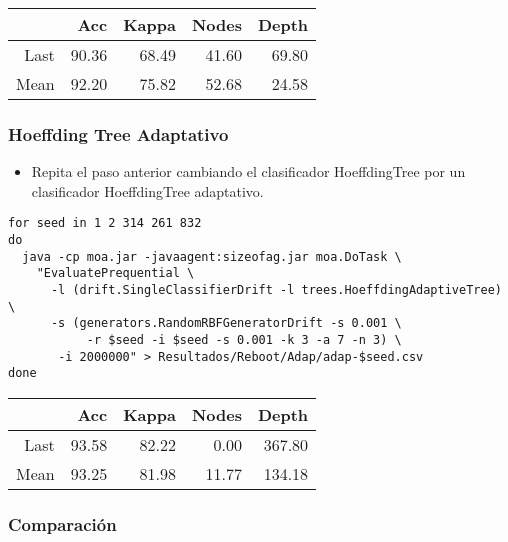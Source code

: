 \documentclass[11pt]{article}
\begin{document}
\begin{table}[ht]
\centering
\begin{tabular}{rrrrr}
  \hline
 & Acc & Kappa & Nodes & Depth \\ 
  \hline
Last & 90.36 & 68.49 & 41.60 & 69.80 \\ 
  Mean & 92.20 & 75.82 & 52.68 & 24.58 \\ 
   \hline
\end{tabular}
\end{table}


\subsubsection{Hoeffding Tree Adaptativo}
\label{sec:org5d37bcd}
\begin{itemize}
\item Repita el paso anterior cambiando el clasificador HoeffdingTree por
un clasificador HoeffdingTree adaptativo.
\end{itemize}
\begin{verbatim}
for seed in 1 2 314 261 832
do
  java -cp moa.jar -javaagent:sizeofag.jar moa.DoTask \
    "EvaluatePrequential \
      -l (drift.SingleClassifierDrift -l trees.HoeffdingAdaptiveTree) \
	  -s (generators.RandomRBFGeneratorDrift -s 0.001 \
	       -r $seed -i $seed -s 0.001 -k 3 -a 7 -n 3) \
       -i 2000000" > Resultados/Reboot/Adap/adap-$seed.csv
done
\end{verbatim}


\begin{table}[ht]
\centering
\begin{tabular}{rrrrr}
  \hline
 & Acc & Kappa & Nodes & Depth \\ 
  \hline
Last & 93.58 & 82.22 & 0.00 & 367.80 \\ 
  Mean & 93.25 & 81.98 & 11.77 & 134.18 \\ 
   \hline
\end{tabular}
\end{table}

\subsubsection{Comparación}
\label{sec:org49f0f09}
\end{document}

